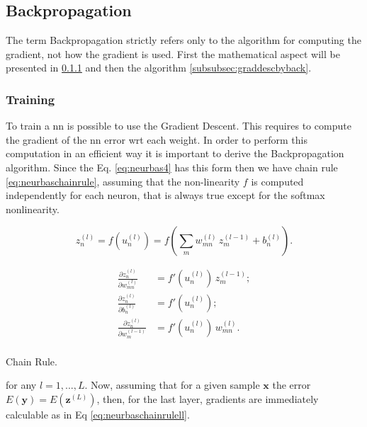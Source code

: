 \subsection{Backpropagation}
\label{sec:backpropagation}
The term Backpropagation strictly refers only to the algorithm for computing the gradient, not how the gradient is used. First the mathematical aspect will be presented in \ref{subsubsec:training} and then the algorithm \ref{subsubsec:graddescbyback}.

\subsubsection{Training}
\label{subsubsec:training}
To train a \gls{nn} is possible to use the Gradient Descent. This requires to compute the gradient of the \gls{nn} error \gls{wrt} each weight. In order to perform this computation in an efficient way it is important to derive the Backpropagation algorithm. Since the Eq. \ref{eq:neurbas4} has this form then we have chain rule \ref{eq:neurbaschainrule}, assuming that the non-linearity $f$ is computed independently for each neuron, that is always true except for the softmax nonlinearity.

\begin{Equation}[H]
	\centering
	\begin{equation} \label{eq:neurbas4}
		z^{(l)}_n = f(u^{(l)}_n) = f \left( \sum_{m} w^{(l)}_{mn} \, z^{(l-1)}_m + b^{(l)}_n \right) .
	\end{equation}
\end{Equation}

\begin{Equation}[H]
	\centering
	\begin{equation} \label{eq:neurbaschainrule}
		\begin{aligned}
			\frac{\partial z^{(l)}_n}{\partial w^{(l)}_{mn}} &= f' \left( u^{(l)}_n \right) \, z^{(l-1)}_m ;\\
			\frac{\partial z^{(l)}_n}{\partial b^{(l)}_n} &= f' \left( u^{(l)}_n \right) ;\\
			\frac{\partial z^{(l)}_n}{\partial w^{(l-1)}_m} &= f' \left( u^{(l)}_n \right) \, w^{(l)}_{mn} .\\
		\end{aligned}
	\end{equation}
	\caption[Chain Rule.]{Chain Rule.}
\end{Equation}

\noindent for any $l=1,...,L$. Now, assuming that for a given sample $\bm{x}$ the error $E(\bm{y})= E(\bm{z}^{(L)})$, then, for the last layer, gradients are immediately calculable as in Eq \ref{eq:neurbaschainrulell}.

